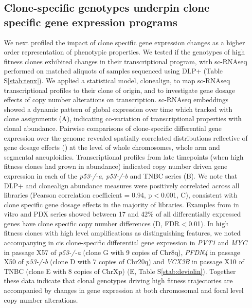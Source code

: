 \subsection*{Clone-specific genotypes underpin clone specific gene expression programs}
We next profiled the impact of clone specific gene expression changes as a higher order representation of phenotypic properties. We tested if the genotypes of high fitness clones exhibited changes in their transcriptional program, with sc-RNAseq performed on matched aliquots of samples sequenced using DLP+ (Table S\ref{stab:tenx}). We applied a statistical model, clonealign\cite{Campbell2019-lp}, to map sc-RNAseq transcriptional profiles to their clone of origin, and to investigate gene dosage effects of copy number alterations on transcription. sc-RNAseq embeddings showed a dynamic pattern of global expression over time which tracked with clone assignments (A), indicating co-variation of transcriptional properties with clonal abundance. Pairwise comparisons of clone-specific differential gene expression over the genome revealed spatially correlated distributions reflective of gene dosage effects () at the level of whole chromosomes, whole arm and segmental aneuploidies.
Transcriptional profiles from late timepoints (when high fitness clones had grown in abundance) indicated copy number driven gene expression in each of the \textit{p53-/-a}, \textit{p53-/-b} and TNBC series (B). We note that DLP+ and clonealign abundance measures were positively correlated across all libraries (Pearson correlation coefficient = 0.94, p$<$0.001, C), consistent with clone specific gene dosage effects in the majority of libraries.  Examples from  in vitro and PDX series showed between 17 and 42\% of all differentially expressed genes have clone specific copy number differences (D, FDR$<$0.01). In high fitness clones with high level amplifications as distinguishing features, we noted accompanying in cis clone-specific differential gene expression in \textit{PVT1} and \textit{MYC} in passage X57 of \textit{p53-/-a} (clone G with 9 copies of Chr8q), \textit{PFDN4} in passage X50 of \textit{p53-/-b} (clone D with 7 copies of Chr20q) and \textit{VCX3B} in passage X10 of TNBC (clone E with 8 copies of ChrXp) (E, Table S\ref{stab:deviolin}). Together these data indicate that clonal genotypes driving high fitness trajectories are accompanied by changes in gene expression at both chromosomal and focal level copy number alterations.


